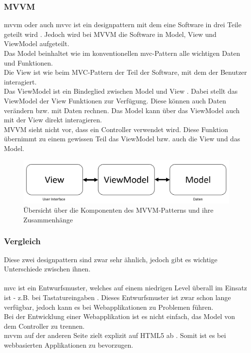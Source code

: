 \subsubsection{MVVM}
\Gls{mvvm} oder auch \Gls{mvvc} ist ein \Gls{designpattern} mit dem eine Software in drei Teile geteilt wird \cite{mvvm_vue}. Jedoch wird bei MVVM die Software in Model, View und ViewModel aufgeteilt.\\
Das Model beinhaltet wie im konventionellen \Gls{mvc}-Pattern alle wichtigen Daten und Funktionen.\\
Die View ist wie beim MVC-Pattern der Teil der Software, mit dem der Benutzer interagiert.\\
Das ViewModel ist ein Bindeglied zwischen Model und View \cite{mvvm_vue}. Dabei stellt das ViewModel der View Funktionen zur Verfügung. Diese können auch Daten verändern bzw. mit Daten rechnen. Das Model kann über das ViewModel auch mit der View direkt interagieren.\\
MVVM sieht nicht vor, dass ein Controller verwendet wird. Diese Funktion übernimmt zu einem gewissen Teil das ViewModel bzw. auch die View und das Model.
\begin{figure}[H]
	\centering
	\includegraphics[width=0.8\linewidth]{images/mvvm}
	\caption[Übersicht des MVVM-Patterns]{Übersicht über die Komponenten des MVVM-Patterns und ihre Zusammenhänge}
	\label{fig:mvvm}
\end{figure}
\newpage
\subsubsection{Vergleich}
Diese zwei \Gls{designpattern} sind zwar sehr ähnlich, jedoch gibt es wichtige Unterschiede zwischen ihnen.\\\\
\Gls{mvc} ist ein Entwurfsmuster, welches auf einem niedrigen Level überall im Einsatz ist - z.B. bei Tastatureingaben \cite{mvc}. Dieses Entwurfsmuster ist zwar schon lange verfügbar, jedoch kann es bei Webapplikationen zu Problemen führen.\\
Bei der Entwicklung einer Webapplikation ist es nicht einfach, das Model von dem Controller zu trennen.\\
\Gls{mvvm} auf der anderen Seite zielt explizit auf HTML5 ab \cite{mvvm_vue}. Somit ist es bei webbasierten Applikationen zu bevorzugen.
